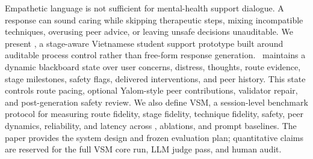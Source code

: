 Empathetic language is not sufficient for mental-health support dialogue. A response can sound caring while skipping therapeutic steps, mixing incompatible techniques, overusing peer advice, or leaving unsafe decisions unauditable. We present \trace, a stage-aware Vietnamese student support prototype built around auditable process control rather than free-form response generation. \trace\ maintains a dynamic blackboard state over user concerns, distress, thoughts, route evidence, stage milestones, safety flags, delivered interventions, and peer history. This state controls route pacing, optional Yalom-style peer contributions, validator repair, and post-generation safety review. We also define VSM, a session-level benchmark protocol for measuring route fidelity, stage fidelity, technique fidelity, safety, peer dynamics, reliability, and latency across \trace, ablations, and prompt baselines. The paper provides the system design and frozen evaluation plan; quantitative claims are reserved for the full VSM core run, LLM judge pass, and human audit.
